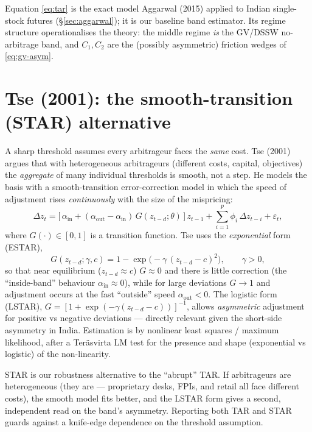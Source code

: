 \begin{takeaway}
Equation \eqref{eq:tar} is the exact model Aggarwal (2015) applied to Indian single-stock futures (\S\ref{sec:aggarwal}); it is our baseline band estimator. Its regime structure operationalises the theory: the middle regime \emph{is} the GV/DSSW no-arbitrage band, and $C_1,C_2$ are the (possibly asymmetric) friction wedges of \eqref{eq:gv-asym}.
\end{takeaway}

\section{Tse (2001): the smooth-transition (STAR) alternative}
\label{sec:tse}
A sharp threshold assumes every arbitrageur faces the \emph{same} cost. Tse (2001) argues that with heterogeneous arbitrageurs (different costs, capital, objectives) the \emph{aggregate} of many individual thresholds is smooth, not a step. He models the basis with a smooth-transition error-correction model in which the speed of adjustment rises \emph{continuously} with the size of the mispricing:
\begin{equation}
\Delta z_t = \big[\,\alpha_{\text{in}} + (\alpha_{\text{out}}-\alpha_{\text{in}})\,G(z_{t-d};\theta)\,\big]\,z_{t-1} + \sum_{i=1}^{p}\phi_i\,\Delta z_{t-i} + \varepsilon_t, \label{eq:star}
\end{equation}
where $G(\cdot)\in[0,1]$ is a transition function. Tse uses the \emph{exponential} form (ESTAR),
\begin{equation}
G(z_{t-d};\gamma,c) = 1 - \exp\!\big(-\gamma\,(z_{t-d}-c)^2\big), \qquad \gamma>0, \label{eq:estar}
\end{equation}
so that near equilibrium ($z_{t-d}\approx c$) $G\approx 0$ and there is little correction (the ``inside-band'' behaviour $\alpha_{\text{in}}\approx 0$), while for large deviations $G\to 1$ and adjustment occurs at the fast ``outside'' speed $\alpha_{\text{out}}<0$. The logistic form (LSTAR), $G=[1+\exp(-\gamma(z_{t-d}-c))]^{-1}$, allows \emph{asymmetric} adjustment for positive vs negative deviations --- directly relevant given the short-side asymmetry in India. Estimation is by nonlinear least squares / maximum likelihood, after a Teräsvirta LM test for the presence and shape (exponential vs logistic) of the non-linearity.

\begin{takeaway}
STAR is our robustness alternative to the ``abrupt'' TAR. If arbitrageurs are heterogeneous (they are --- proprietary desks, FPIs, and retail all face different costs), the smooth model fits better, and the LSTAR form gives a second, independent read on the band's asymmetry. Reporting both TAR and STAR guards against a knife-edge dependence on the threshold assumption.
\end{takeaway}

